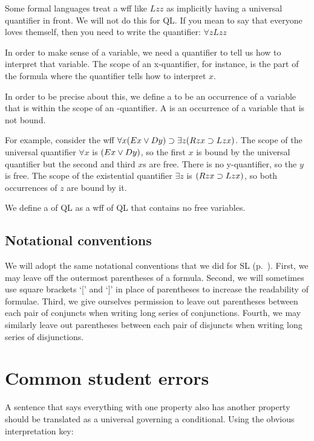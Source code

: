 Some formal languages treat a wff like $Lzz$ as implicitly having a universal quantifier in front. We will not do this for QL. If you mean to say that everyone loves themself, then you need to write the quantifier: $\forall zLzz$

In order to make sense of a variable, we need a quantifier to tell us how to interpret that variable. The scope of an x-quantifier, for instance, is the part of the formula where the quantifier tells how to interpret $x$.

In order to be precise about this, we define a  to be an occurrence of a variable  that is within the scope of an -quantifier. A  is an occurrence of a variable that is not bound.

For example, consider the wff $\forall x(Ex \vee Dy) \supset \exists z(Rzx \supset Lzx)$. The scope of the universal quantifier $\forall x$ is $(Ex \vee Dy)$, so the first $x$ is bound by the universal quantifier but the second and third $x$s are free. There is no y-quantifier, so the $y$ is free. The scope of the existential quantifier $\exists z$ is $(Rzx \supset Lzx)$, so both occurrences of $z$ are bound by it.

We define a  of QL as a wff of QL that contains no free variables.

\subsection{Notational conventions}

We will adopt the same notational conventions that we did for SL (p.~\pageref{SLconventions}). First, we may leave off the outermost parentheses of a formula. Second, we will sometimes use square brackets `[' and `]' in place of parentheses to increase the readability of formulae. Third, we give ourselves permission to leave out parentheses between each pair of conjuncts when writing long series of conjunctions. Fourth, we may similarly leave out parentheses between each pair of disjuncts when writing long series of disjunctions.

\section{Common student errors}

A sentence that says everything with one property also has another property should be translated as a universal governing a conditional. Using the obvious interpretation key:


